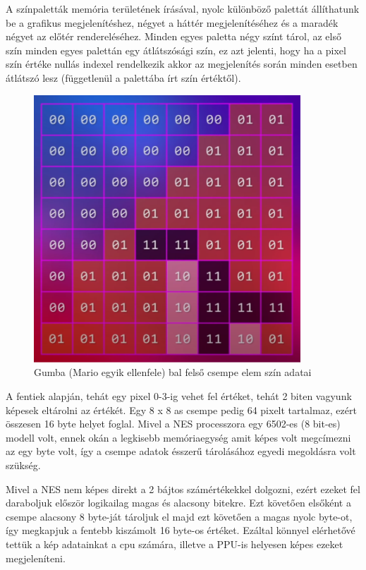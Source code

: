 	A színpaletták memória területének írásával, nyolc különböző palettát állíthatunk be a grafikus megjelenítéshez, négyet a háttér megjelenítéséhez és a maradék négyet az előtér rendereléséhez. Minden egyes paletta négy színt tárol, az első szín minden egyes palettán egy átlátszósági szín, ez azt jelenti, hogy ha a pixel szín értéke nullás indexel rendelkezik akkor az megjelenítés során minden esetben átlátszó lesz (függetlenül a palettába írt szín értéktől).
	
	\begin{figure}[H]
	\centering
	\includegraphics[width=100mm, keepaspectratio]{figures/Gumba-tile}
	\caption{Gumba (Mario egyik ellenfele) bal felső csempe elem szín adatai \cite{Neshacker_ppu}}
	\label{fig:Gumba-tile}
	\end{figure}
	
	A fentiek alapján, tehát egy pixel 0-3-ig vehet fel értéket, tehát 2 biten vagyunk képesek eltárolni az értékét. Egy 8 x 8 as csempe pedig 64 pixelt tartalmaz, ezért összesen 16 byte helyet foglal. Mivel a NES processzora egy 6502-es (8 bit-es) modell volt, ennek okán a legkisebb memóriaegység amit képes volt megcímezni az egy byte volt, így a csempe adatok ésszerű tárolásához egyedi megoldásra volt szükség.
	
	Mivel a NES nem képes direkt a 2 bájtos számértékekkel dolgozni, ezért ezeket fel daraboljuk először logikailag magas és alacsony bitekre. Ezt követően elsőként a csempe alacsony 8 byte-ját tároljuk el majd ezt követően a magas nyolc byte-ot, így megkapjuk a fentebb kiszámolt 16 byte-os értéket. Ezáltal könnyel elérhetővé tettük a kép adatainkat a cpu számára, illetve a PPU-is helyesen képes ezeket megjeleníteni.
	
